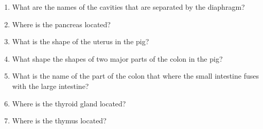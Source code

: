 \begin{enumerate}
\def\labelenumi{\arabic{enumi}.}
\tightlist
\item
  What are the names of the cavities that are separated by the
  diaphragm?
\item
  Where is the pancreas located?
\item
  What is the shape of the uterus in the pig?
\item
  What shape the shapes of two major parts of the colon in the pig?
\item
  What is the name of the part of the colon that where the small
  intestine fuses with the large intestine?
\item
  Where is the thyroid gland located?
\item
  Where is the thymus located?
\end{enumerate}
